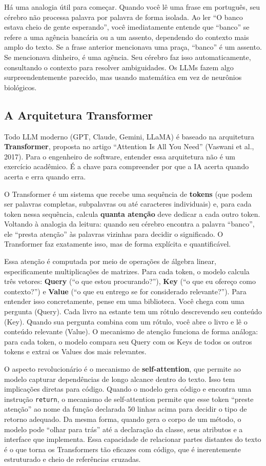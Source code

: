 Há uma analogia útil para começar. Quando você lê uma frase em português, seu cérebro
não processa palavra por palavra de forma isolada. Ao ler ``O banco estava cheio de
gente esperando'', você imediatamente entende que ``banco'' se refere a uma agência
bancária ou a um assento, dependendo do contexto mais amplo do texto. Se a frase
anterior mencionava uma praça, ``banco'' é um assento. Se mencionava dinheiro, é uma
agência. Seu cérebro faz isso automaticamente, consultando o contexto para resolver
ambiguidades. Os LLMs fazem algo surpreendentemente parecido, mas usando matemática
em vez de neurônios biológicos.

\subsection{A Arquitetura Transformer}

Todo LLM moderno (GPT, Claude, Gemini, LLaMA) é baseado na arquitetura
\textbf{Transformer}, proposta no artigo ``Attention Is All You Need''
(Vaswani et al., 2017). Para o engenheiro de software, entender essa
arquitetura não é um exercício acadêmico. É a chave para compreender
por que a IA acerta quando acerta e erra quando erra.

O Transformer é um sistema que recebe uma sequência de \textbf{tokens}
(que podem ser palavras completas, subpalavras ou até caracteres individuais) e,
para cada token nessa sequência, calcula \textbf{quanta atenção} deve dedicar a cada
outro token. Voltando à analogia da leitura: quando seu cérebro encontra a palavra
``banco'', ele ``presta atenção'' às palavras vizinhas para decidir o significado. O
Transformer faz exatamente isso, mas de forma explícita e quantificável.

Essa atenção é computada por meio de operações de álgebra linear, especificamente
multiplicações de matrizes. Para cada token, o modelo calcula três vetores:
\textbf{Query} (``o que estou procurando?''), \textbf{Key} (``o que eu ofereço como
contexto?'') e \textbf{Value} (``o que eu entrego se for considerado relevante?'').
Para entender isso concretamente, pense em uma biblioteca. Você chega com uma
pergunta (Query). Cada livro na estante tem um rótulo descrevendo seu conteúdo (Key).
Quando sua pergunta combina com um rótulo, você abre o livro e lê o conteúdo
relevante (Value). O mecanismo de atenção funciona de forma análoga: para cada token,
o modelo compara seu Query com os Keys de todos os outros tokens e extrai os Values
dos mais relevantes.

O aspecto revolucionário é o mecanismo de \textbf{self-attention}, que
permite ao modelo capturar dependências de longo alcance dentro do texto. Isso tem
implicações diretas para código. Quando o modelo gera código e encontra uma instrução
\texttt{return}, o mecanismo de self-attention permite que esse token ``preste atenção''
ao nome da função declarada 50 linhas acima para decidir o tipo de retorno adequado.
Da mesma forma, quando gera o corpo de um método, o modelo pode ``olhar para trás''
até a declaração da classe, seus atributos e a interface que implementa. Essa capacidade
de relacionar partes distantes do texto é o que torna os Transformers tão eficazes com
código, que é inerentemente estruturado e cheio de referências cruzadas.

